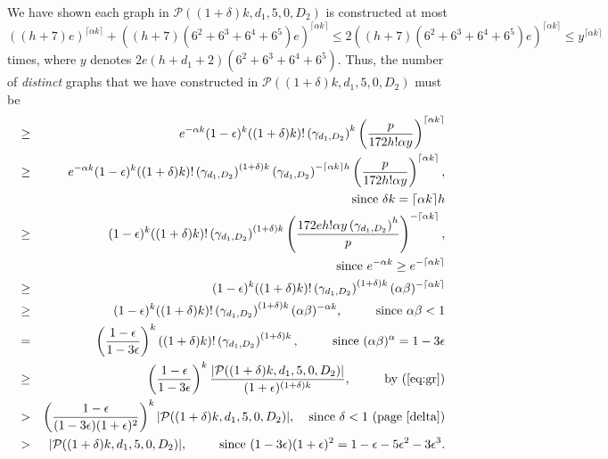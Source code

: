 \documentclass{article}
\newtheorem{Proof of Theorem}{Proof of Theorem}
\begin{document}
We have shown each graph in $\mathcal{P}((1+\delta)k,d_{1},5,0,D_{2})$ is constructed at most
$((h+7)e)^{\lceil \alpha k \rceil} + ((h+7)(6^{2}+6^{3}+6^{4}+6^{5})e)^{\lceil \alpha k \rceil}
\leq 2 ((h+7)(6^{2}+6^{3}+6^{4}+6^{5})e)^{\lceil \alpha k \rceil}
\leq y^{\lceil \alpha k \rceil}$ times,
where $y$ denotes $2e(h+d_{1}+2)(6^{2}+6^{3}+6^{4}+6^{5})$.
Thus, the number of \textit{distinct} graphs 
that we have constructed in $\mathcal{P}((1+\delta)k,d_{1},5,0,D_{2})$ must be
\begin{eqnarray*}
& \geq & e^{-\alpha k} (1-\epsilon)^{k} ((1+\delta)k)! \left( \gamma_{d_{1},D_{2}} \right)^{k}
\left( \frac{p}{172h! \alpha y} \right)^{\lceil \alpha k \rceil} \\
& \geq & e^{-\alpha k} (1-\epsilon)^{k} ((1+\delta)k)! \left( \gamma_{d_{1},D_{2}} \right)^{(1+\delta)k}
\left( \gamma_{d_{1},D_{2}} \right)^{- \lceil \alpha k \rceil h}
\left( \frac{p}{172h! \alpha y} \right)^{\lceil \alpha k \rceil}, \\
& & \textrm{ since } \delta k = \lceil \alpha k \rceil h \\
& \geq & (1-\epsilon)^{k} ((1+\delta)k)! \left( \gamma_{d_{1},D_{2}} \right)^{(1+\delta)k}
\left( \frac{172 e h! \alpha y \left( \gamma_{d_{1},D_{2}} \right)^{h}}{p} \right)^{- \lceil \alpha k \rceil}, \\
& & \textrm{ since } e^{-\alpha k} \geq e^{- \lceil \alpha k \rceil} \\
& \geq & (1-\epsilon)^{k} ((1+\delta)k)! \left( \gamma_{d_{1},D_{2}} \right)^{(1+\delta)k}
(\alpha \beta)^{- \lceil \alpha k \rceil} \\
& \geq & (1-\epsilon)^{k} ((1+\delta)k)! \left( \gamma_{d_{1},D_{2}} \right)^{(1+\delta)k}
(\alpha \beta)^{- \alpha k} 
\textrm{, \phantom{www} since } \alpha \beta < 1 \\
& = & \left( \frac{1-\epsilon}{1-3\epsilon} \right)^{k} ((1+\delta)k)! \left( \gamma_{d_{1},D_{2}} \right)^{(1+\delta)k} 
\textrm{, \phantom{www} since } (\alpha \beta)^{\alpha} = 1-3 \epsilon \\
& \geq & \left( \frac{1-\epsilon}{1-3\epsilon} \right)^{k} 
\frac{|\mathcal{P}((1+\delta)k,d_{1},5,0,D_{2})|}{(1+\epsilon)^{(1+\delta)k}} 
\textrm{, \phantom{www} by (\ref{eq:gr})} \\
& > & \left( \frac{1-\epsilon}{(1-3\epsilon)(1+\epsilon)^{2}} \right)^{k} 
|\mathcal{P}((1+\delta)k,d_{1},5,0,D_{2})|, \phantom{w} \textrm{ since } \delta < 1 \textrm{ (page~\pageref{delta})} \\
& > & |\mathcal{P}((1+\delta)k,d_{1},5,0,D_{2})|, \phantom{www} \textrm{ since }
(1-3\epsilon)(1+\epsilon)^{2} = 1 - \epsilon - 5 \epsilon^{2} - 3 \epsilon^{3}.
\end{eqnarray*}
\end{document}
